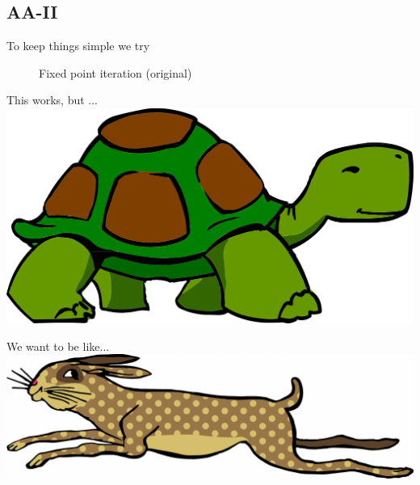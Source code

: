 \subsection{AA-II}
\begin{frame}
	To keep things simple we try

	\begin{figure}
	\begin{algorithm}[H]
	\caption{Fixed point iteration (original)}\label{alg:cap}
	
	\BlankLine
	\end{algorithm}
	\end{figure}
\end{frame}


\begin{frame}
	\begin{block}{This works, but ...} \vspace{1cm}
		\includegraphics[scale=0.25]{../Figures/turtle}	
	\end{block}
\end{frame}
\begin{frame}
	\begin{block}{We want to be like...} \vspace{2cm}
		\includegraphics[scale=0.17]{../Figures/hare}
	\end{block}
\end{frame}

